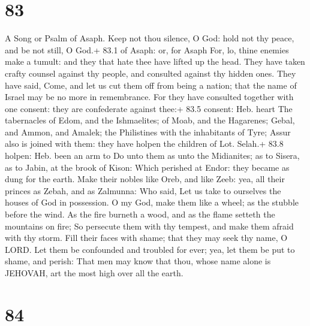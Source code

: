 \hypertarget{section-82}{%
\section{83}\label{section-82}}

A Song or Psalm of Asaph.  Keep not thou silence, O God:
hold not thy peace, and be not still, O God.+ 83.1 of Asaph: or, for
Asaph  For, lo, thine enemies make a tumult: and they that
hate thee have lifted up the head.  They have taken crafty
counsel against thy people, and consulted against thy hidden ones.
 They have said, Come, and let us cut them off from being a
nation; that the name of Israel may be no more in remembrance.
 For they have consulted together with one consent: they are
confederate against thee:+ 83.5 consent: Heb. heart  The
tabernacles of Edom, and the Ishmaelites; of Moab, and the Hagarenes;
 Gebal, and Ammon, and Amalek; the Philistines with the
inhabitants of Tyre;  Assur also is joined with them: they
have holpen the children of Lot. Selah.+ 83.8 holpen: Heb. been an arm
to  Do unto them as unto the Midianites; as to Sisera, as to
Jabin, at the brook of Kison:  Which perished at Endor:
they became as dung for the earth.  Make their nobles like
Oreb, and like Zeeb: yea, all their princes as Zebah, and as Zalmunna:
 Who said, Let us take to ourselves the houses of God in
possession.  O my God, make them like a wheel; as the
stubble before the wind.  As the fire burneth a wood, and
as the flame setteth the mountains on fire;  So persecute
them with thy tempest, and make them afraid with thy storm.
 Fill their faces with shame; that they may seek thy name,
O LORD.  Let them be confounded and troubled for ever; yea,
let them be put to shame, and perish:  That men may know
that thou, whose name alone is JEHOVAH, art the most high over all the
earth.

\hypertarget{section-83}{%
\section{84}\label{section-83}}

